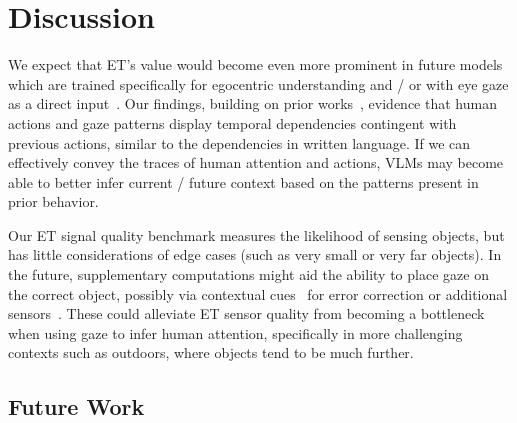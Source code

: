 \section{Discussion}



We expect that ET's value would become even more prominent in future models which are trained specifically for egocentric understanding and / or with eye gaze as a direct input~\cite{koorathota_attention_2023}.  Our findings, building on prior works~\cite{toyama_recognition_2012,  burlingham_scanpaths_2024}, evidence that human actions and gaze patterns display temporal dependencies contingent with previous actions, similar to the dependencies in written language.  If we can effectively convey the traces of human attention and actions, VLMs may become able to better infer current / future context based on the patterns present in prior behavior.

Our ET signal quality benchmark measures the likelihood of sensing objects, but has little considerations of edge cases (such as very small or very far objects).  In the future, supplementary computations might aid the ability to place gaze on the correct object, possibly via contextual cues~\cite{bi_bayesian_2013} for error correction or additional sensors~\cite{wei_predicting_2023}.  These could alleviate ET sensor quality from becoming a bottleneck when using gaze to infer human attention, specifically in more challenging contexts such as outdoors, where objects tend to be much further.

\subsection{Future Work}

